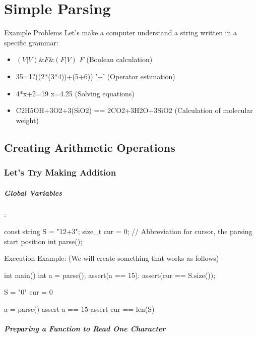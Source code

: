  \chapter{Simple Parsing}\label{chapter:parsing}

\begin{itembox}[l]{Example Problems}
Let's make a computer understand a string written in a specific grammar:
  \begin{itemize}
\setlength{\itemsep}{0pt}
  \item $( V | V ) \& F \& ( F| V)$ \dingright $F$ (Boolean calculation)
  \item 35=1?((2*(3*4))+(5+6)) \dingright '+'  (Operator estimation)
  \item 4*x+2=19 \dingright x=4.25 (Solving equations)
  \item C2H5OH+3O2+3(SiO2) == 2CO2+3H2O+3SiO2 (Calculation of molecular weight)
  \end{itemize}  
\end{itembox}

\section{Creating Arithmetic Operations}
\subsection{Let's Try Making Addition}

\paragraph{Global Variables}:
\begin{cbox}
const string S = "12+3";
size_t cur = 0; // Abbreviation for cursor, the parsing start position
int parse();
\end{cbox}

Execution Example: (We will create something that works as follows)
\begin{cbox}
int main() {
  int a = parse();
  assert(a == 15);
  assert(cur == S.size());
}  
\end{cbox}

\begin{pybox}
S = "0"
cur = 0

a = parse()
assert a == 15
assert cur == len(S)
\end{pybox}

\paragraph{Preparing a Function to Read One Character}


